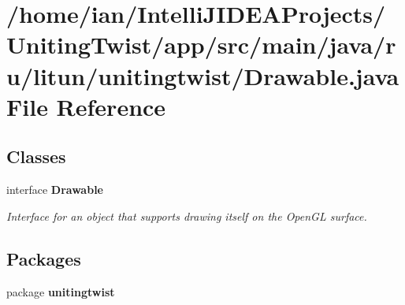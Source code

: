 \section{/home/ian/\+Intelli\+J\+I\+D\+E\+A\+Projects/\+Uniting\+Twist/app/src/main/java/ru/litun/unitingtwist/\+Drawable.java File Reference}
\label{_drawable_8java}
\subsection*{Classes}
\begin{DoxyCompactItemize}
\item 
interface \textbf{ Drawable}
\begin{DoxyCompactList}\small\item\em Interface for an object that supports drawing itself on the Open\+GL surface. \end{DoxyCompactList}\end{DoxyCompactItemize}
\subsection*{Packages}
\begin{DoxyCompactItemize}
\item 
package \textbf{ unitingtwist}
\end{DoxyCompactItemize}
